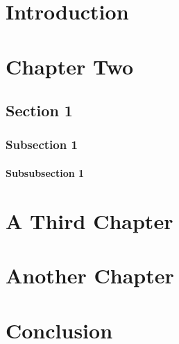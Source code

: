\documentclass[12pt, TexShade, letterpaper]{report}
\begin{document}
	\tableofcontents\thispagestyle{plain}

	\listoffigures\thispagestyle{plain}
	\listoftables
	\glsaddall
	\setlength\LTleft{0pt}
	\setlength\LTright{0pt}
	\setlength\glsdescwidth{0.8\hsize}
	\printglossary[title={List of Acronyms}]

 	\clearpage
	
	\glsresetall
\chapter{Introduction}

	
\chapter{Chapter Two}
\section{Section 1}
\subsection{Subsection 1}
\subsubsection{Subsubsection 1}

\chapter{A Third Chapter}

\chapter{Another Chapter}
	
\chapter{Conclusion}

	{
	
	
	
	
	}
	
\end{document}
